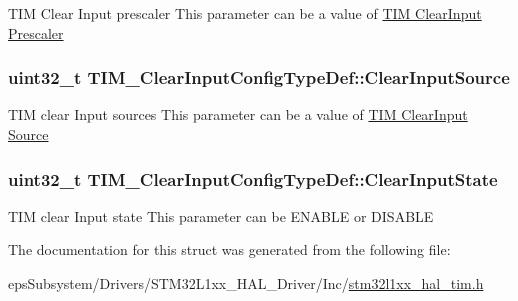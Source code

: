 T\-I\-M Clear Input prescaler This parameter can be a value of \hyperlink{group___t_i_m___clear_input___prescaler}{T\-I\-M Clear\-Input Prescaler} \hypertarget{struct_t_i_m___clear_input_config_type_def_a776d2f14021a82e022468fd46594b8a0}{
\subsubsection[{Clear\-Input\-Source}]{\setlength{\rightskip}{0pt plus 5cm}uint32\-\_\-t T\-I\-M\-\_\-\-Clear\-Input\-Config\-Type\-Def\-::\-Clear\-Input\-Source}}\label{struct_t_i_m___clear_input_config_type_def_a776d2f14021a82e022468fd46594b8a0}
T\-I\-M clear Input sources This parameter can be a value of \hyperlink{group___t_i_m___clear_input___source}{T\-I\-M Clear\-Input Source} \hypertarget{struct_t_i_m___clear_input_config_type_def_a01d4b91dd297c4f0582a4d9179abf32f}{
\subsubsection[{Clear\-Input\-State}]{\setlength{\rightskip}{0pt plus 5cm}uint32\-\_\-t T\-I\-M\-\_\-\-Clear\-Input\-Config\-Type\-Def\-::\-Clear\-Input\-State}}\label{struct_t_i_m___clear_input_config_type_def_a01d4b91dd297c4f0582a4d9179abf32f}
T\-I\-M clear Input state This parameter can be E\-N\-A\-B\-L\-E or D\-I\-S\-A\-B\-L\-E 

The documentation for this struct was generated from the following file\-:\begin{DoxyCompactItemize}
\item 
eps\-Subsystem/\-Drivers/\-S\-T\-M32\-L1xx\-\_\-\-H\-A\-L\-\_\-\-Driver/\-Inc/\hyperlink{stm32l1xx__hal__tim_8h}{stm32l1xx\-\_\-hal\-\_\-tim.\-h}\end{DoxyCompactItemize}
